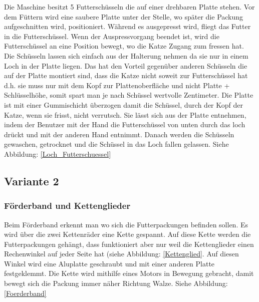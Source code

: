 Die Maschine besitzt 5 Futterschüsseln die auf einer drehbaren Platte stehen. Vor dem Füttern wird eine saubere Platte unter der Stelle, wo später die Packung aufgeschnitten wird, positioniert. Während es ausgepresst wird, fliegt das Futter in die Futterschüssel. Wenn der Auspressvorgang beendet ist, wird die Futterschüssel an eine Position bewegt, wo die Katze Zugang zum fressen hat. Die Schüsseln lassen sich einfach aus der Halterung nehmen da sie nur in einem Loch in der Platte liegen. Das hat den Vorteil gegenüber anderen Schüsseln die auf der Platte montiert sind, dass die Katze nicht soweit zur Futterschüssel hat d.h. sie muss nur mit dem Kopf zur Plattenoberfläche und nicht Platte + Schlüsselhöhe, somit spart man je nach Schüssel wertvolle Zentimeter. Die Platte ist mit einer Gummischicht überzogen damit die Schüssel, durch der Kopf der Katze, wenn sie frisst, nicht verrutsch. Sie lässt sich aus der Platte entnehmen, indem der Benutzer mit der Hand die Futterschüssel von unten durch das loch drückt und mit der anderen Hand entnimmt. Danach werden die Schüsseln gewaschen, getrocknet und die Schüssel in das Loch fallen gelassen. Siehe Abbildung: \ref{Loch_Futterschuessel}

\newpage

\subsection{Variante 2}

\subsubsection{Förderband und Kettenglieder}

Beim Förderband erkennt man wo sich die Futterpackungen befinden sollen. Es wird über die zwei Kettenräder eine Kette gespannt. Auf diese Kette werden die Futterpackungen gehängt, dass funktioniert aber nur weil die Kettenglieder einen Rechenwinkel auf jeder Seite hat (siehe Abbildung: \ref{Kettenglied}. Auf diesen Winkel wird eine Aluplatte geschraubt und mit einer anderen Platte festgeklemmt. Die Kette wird mithilfe eines Motors in Bewegung gebracht, damit bewegt sich die Packung immer näher Richtung Walze. Siehe Abbildung: \ref{Foerderband}

